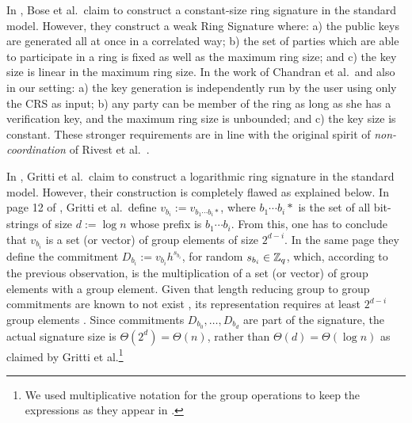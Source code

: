 In \cite{ACISP:BosDasRan15}, Bose et al.~claim to construct a constant-size ring signature in the standard model. However, they construct a weak Ring Signature where: a) the public keys are generated all at once in a correlated way; b) the set of parties which are able to participate in a ring is fixed as well as the maximum ring size; and c) the key size is linear in the maximum ring size. In the work of Chandran et al.~and also in our setting: a) the key generation is independently run by the user using only the CRS as input; b) any party can be member of the ring as long as she has a verification key, and the maximum ring size is unbounded; and c) the key size is constant. These stronger requirements are in line with the original spirit of \emph{non-coordination} of  Rivest et al.~\cite{AC:RivShaTau01}.

In \cite{IET:GriSusPla16}, Gritti et al.~claim to construct a logarithmic ring signature in the standard model. However, their construction is completely flawed as explained below. 
In page 12 of \cite{IET:GriSusPla16}, Gritti et al.~define $v_{b_i} := v_{b_1\cdots b_i *}$, where $b_1\cdots b_i *$ is the set of all bit-strings of size $d:=\log n$ whose prefix is $b_1\cdots b_i$. From this, one has to conclude that $v_{b_i}$ is a set (or vector) of group elements of size $2^{d-i}$.
In the same page they define the commitment $D_{b_i} := v_{b_i}h^{s_{b_i}}$, for random $s_{b_i}\in\mathbb{Z}_q$, which, according to the previous observation, is the multiplication of a set (or vector) of group elements with a group element. Given that length reducing group to group commitments are known to not exist \cite{EC:AbeHarOhk12}, its representation requires at least $2^{d-i}$ group elements . Since commitments $D_{b_0},\ldots,D_{b_d}$ are part of the signature, the actual signature size is $\Theta(2^d)=\Theta(n)$, rather than  $\Theta(d)=\Theta(\log n)$ as claimed by Gritti et al.\footnote{We used multiplicative notation for the group operations to keep the expressions as they appear in \cite{IET:GriSusPla16}.}


